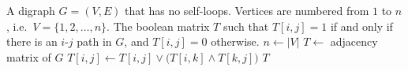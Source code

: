 
\begin{algorithmic}[1]
\Require A digraph $G = (V, E)$ that has no self-loops. Vertices are
  numbered from $1$ to $n$, i.e.~$V = \{1, 2, \dots, n\}$.
\Ensure The boolean matrix $T$ such that $T[i,j] = 1$ if and only if
  there is an $i$-$j$ path in $G$, and $T[i,j] = 0$ otherwise.
\State $n \gets |V|$
\State $T \gets$ adjacency matrix of $G$
      \State $T[i,j] \gets T[i,j] \vee \big( T[i,k] \wedge T[k,j] \big)$
    \EndFor
  \EndFor
\EndFor
\State \Return $T$
\end{algorithmic}
